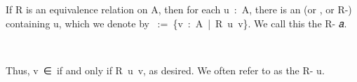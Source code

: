 If \ab R is an equivalence relation on \ab A, then for each \ab u~\as :~\ab A, there is an  (or , or \ab R-) containing \ab u, which we denote by \af [~\ab u~\af ]~\as :=~\{\ab v~\as :~\ab A~|~\ab R~\ab u~\ab v\}.  We call this the \ab R- \ab 𝑎.
\ccpad
\begin{code}%
\>[0][@{}l@{\AgdaIndent{1}}]%
\>[1]\AgdaOperator{\AgdaFunction{[\AgdaUnderscore{}]}}\AgdaSpace{}%
\AgdaSymbol{:}\AgdaSpace{}%
\AgdaSymbol{\{}\AgdaSpace{}%
\AgdaSymbol{:}\AgdaSpace{}%
\AgdaSpace{}%
\AgdaSymbol{\}}\AgdaSpace{}%
\AgdaSpace{}%
\AgdaSpace{}%
\AgdaSpace{}%
\AgdaSymbol{\{}\AgdaSpace{}%
\AgdaSymbol{:}\AgdaSpace{}%
\AgdaSpace{}%
\AgdaSpace{}%
\AgdaSymbol{\}}\AgdaSpace{}%
\AgdaSpace{}%
\AgdaSpace{}%
\AgdaSpace{}%
\<%
\\
%
\>[1]\AgdaOperator{\AgdaFunction{[}}\AgdaSpace{}%
\AgdaSpace{}%
\AgdaOperator{\AgdaFunction{]}}\AgdaSymbol{\{}\AgdaSymbol{\}}\AgdaSpace{}%
\AgdaSymbol{=}\AgdaSpace{}%
\AgdaSpace{}%
\<%
\end{code}
\ccpad
Thus, \ab v~\as ∈~\af [~\ab u~\af ] if and only if \ab R~\ab u~\ab v, as desired.  We often refer to \af [~\ab u~\af ] as the \ab R- \ab u.

